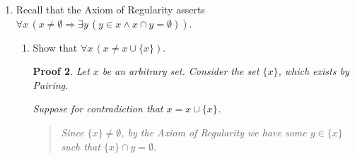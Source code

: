 \documentclass[12pt]{article}
\theoremstyle{proofstyle}
\newtheorem*{proof*}{Proof}
\begin{document}
\begin{enumerate}[left=0pt, itemsep=2em, parsep=1em]
\begin{enumerate}[label=(\alph*), itemsep=1.5em, leftmargin=2em]
\begin{proof*}
    \begin{quote}
        Let $w$ be arbitrary.

        Note that by the respective definitions:
        \begin{align*}
            w \in x \mathbin{\triangle} y &\Leftrightarrow w \in (x \setminus y) \cup (y \setminus x)\\
            &\Leftrightarrow (w \in x \wedge w \notin y) \vee (w \in y \wedge w \notin x).\\ \
            \\
            w \in (x \cup y) \setminus (x \cap y) &\Leftrightarrow w \in x \cup y \wedge w \notin x \cap y\\
            &\Leftrightarrow (w \in x \vee w \in y) \wedge \neg(w \in x \wedge w \in y)\\
            &\Leftrightarrow (w \in x \vee w \in y) \wedge (w \notin x \vee w \notin y). \\
            &\Leftrightarrow (w \in x \wedge w \notin y) \vee (w \in y \wedge w \notin x).\\ 
        \end{align*}
        Since both conditions reduce to $(w \in x \wedge w \notin y) \vee (w \in y \wedge w \notin x)$, we have $w \in x \mathbin{\triangle} y \Leftrightarrow w \in (x \cup y) \setminus (x \cap y)$.
    \end{quote}
    Therefore, by Extensionality, $x \mathbin{\triangle} y = (x \cup y) \setminus (x \cap y)$. \qed
\end{proof*}

\end{enumerate}
\newpage
\item Recall that the Axiom of Regularity asserts $\forall x\,(x \neq \emptyset \Rightarrow \exists y\,(y \in x \wedge x \cap y = \emptyset))$.

\begin{enumerate}[label=(\alph*), itemsep=1.5em, leftmargin=2em]

\item Show that $\forall x\,(x \neq x \cup \{x\})$.

\begin{proof*}
    Let $x$ be an arbitrary set. Consider the set $\{x\}$, which exists by Pairing.

    Suppose for contradiction that $x = x \cup \{x\}$.
\begin{quote}
         Since $\{x\} \neq \emptyset$, by the Axiom of Regularity we have some $y \in \{x\}$ such that $\{x\} \cap y = \emptyset$.


\end{quote}
\end{proof*}
\end{enumerate}
\end{enumerate}
\end{document}
